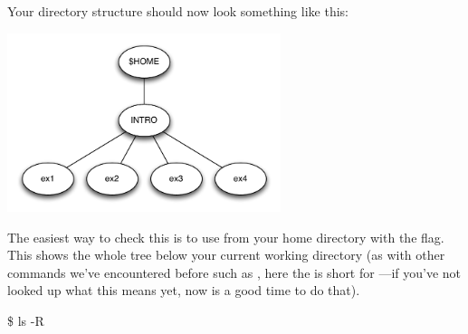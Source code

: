 Your directory structure should now look something like this:
     \begin{center}
       \includegraphics[width=0.6\textwidth]{images/intro-dir-structure}
     \end{center}

The easiest way to check this is to use
 from your home directory with the  flag. This shows the whole tree
below your current working directory (as with other commands we've encountered before such as , here the  is short for
---if you've not looked up what this means yet, now is a good time to do that).

\begin{ttoutenv}
\$ ls -R
\end{ttoutenv}
%

